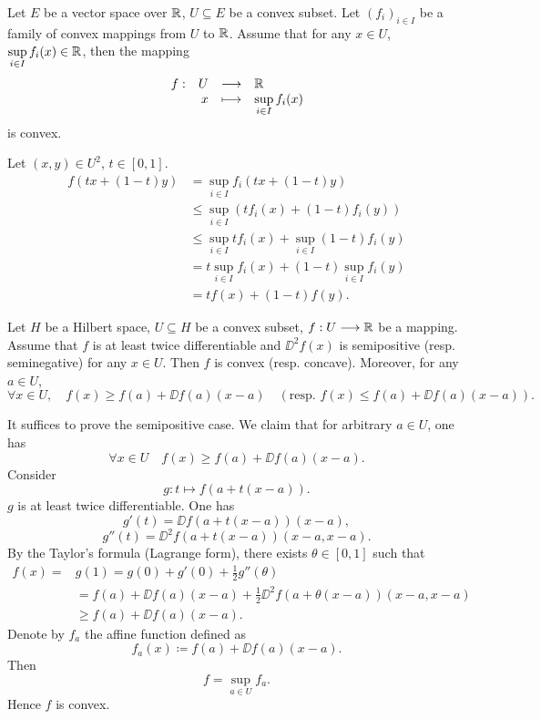 \begin{propositionenv}
    Let $E$ be a vector space over $\mathbb{R}$, $U \subseteq E$ be a convex subset.
    Let $(f_i)_{i \in I}$ be a family of convex mappings from $U$ to $\mathbb{R}$.
    Assume that for any $x \in U$, $\displaystyle \sup_{i \in I}f_i(x) \in \mathbb{R}$, then the mapping
    $$\begin{array}{rrcl}
        f : &  U & \longrightarrow & \mathbb{R}\\
        & x & \longmapsto & \displaystyle \sup_{i \in I}f_i(x)
    \end{array}$$
    is convex.
\end{propositionenv}
\begin{proofenv}
    Let $(x,y) \in U^2$, $t \in [0,1]$.
    $$\begin{aligned}
        f(tx + (1 - t)y) &= \sup_{i \in I}f_i(tx + (1 - t)y)\\
        & \le \sup_{i \in I}(t f_i(x) + (1 - t)f_i(y))\\
        & \le \sup_{i \in I} t f_i(x) + \sup_{i \in I}(1 - t)f_i(y)\\
        & = t \sup_{i \in I}f_i(x) + (1 - t) \sup_{i \in I}f_i(y)\\
        & = t f(x) + (1 - t) f(y).
    \end{aligned}$$
\end{proofenv}

\begin{propositionenv}
    Let $H$ be a Hilbert space,
    $U \subseteq H$ be a convex subset,
    $f : U \longrightarrow \mathbb{R}$ be a mapping.
    Assume that $f$ is at least twice differentiable and $\DD^2 f(x)$ is semipositive (resp. seminegative) for any $x \in U$.
    Then $f$ is convex (resp. concave).
    \quad Moreover, for any $a \in U$,
    $$\forall x \in U,\quad f(x) \ge f(a) + \DD f(a)(x - a) \quad \left(\text{resp. } f(x) \le f(a) + \DD f(a)(x - a) \right).$$
\end{propositionenv}
\begin{proofenv}
    It suffices to prove the semipositive case.
    We claim that for arbitrary $a \in U$, one has
    $$\forall x \in U \quad f(x) \ge f(a) + \DD f(a)(x - a).$$
    Consider
    $$g : t \longmapsto f(a + t(x - a)).$$
    $g$ is at least twice differentiable.
    One has
    $$g'(t) = \DD f(a + t(x - a))(x - a),$$
    $$g''(t) = \DD^2 f(a + t(x - a))(x - a, x - a).$$
    By the Taylor's formula (Lagrange form), there exists $\theta \in [0,1]$ such that
    $$\begin{aligned}
        f(x) = & g(1) = g(0) + g'(0) + \frac{1}{2} g''(\theta)\\
        & = f(a) + \DD f(a)(x - a) + \frac{1}{2} \DD^2 f(a + \theta(x - a))(x - a, x - a)\\
        & \ge f(a) + \DD f(a)(x - a). 
    \end{aligned}$$
    Denote by $f_a$ the affine function defined as
    $$f_a(x) \coloneq f(a) + \DD f(a) (x - a).$$
    Then
    $$f = \sup_{a \in U} f_{a}.$$
    Hence $f$ is convex.
\end{proofenv}

